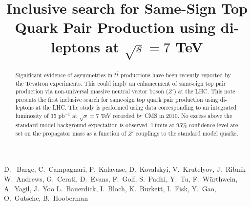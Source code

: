 \documentclass{cmspaper}
\begin{document}
%
\begin{titlepage}
\title{Inclusive search for Same-Sign Top Quark Pair Production using di-leptons at $\sqrt{s} = 7 $ TeV}

  \begin{Authlist}
    D.~ Barge, C.~Campagnari, P.~Kalavase, D.~Kovalskyi, V.~Krutelyov, J.~Ribnik
    W.~Andrews, G.~Cerati, D.~Evans, F.~Golf, S.~Padhi, Y.~Tu, F.~W\"urthwein, A.~Yagil, J.~Yoo
    L.~Bauerdick, I.~Bloch, K.~Burkett, I.~Fisk, Y.~Gao, O.~Gutsche, B.~Hooberman
  \end{Authlist}

\begin{abstract}
Significant evidence of asymmetries in $t\bar{t}$ productions have been recently reported by the Tevatron experiments. 
This could imply an enhancement of  same-sign top pair production via non-universal massive neutral vector boson ($Z'$) at the LHC. 
This note presents the first inclusive search for same-sign top quark pair production using di-leptons at the LHC. 
The study is performed using data corresponding to an integrated luminosity of 35 pb$^{-1}$ at $\sqrt{s} = 7 $ TeV recorded  by CMS in 2010. 
No excess above the standard model background expectation is observed. Limits at 95\% confidence level are set 
on the propagator mass as a function of $Z'$ couplings to the standard model quarks. 
\end{abstract}
\end{titlepage}




\clearpage

\end{document}
